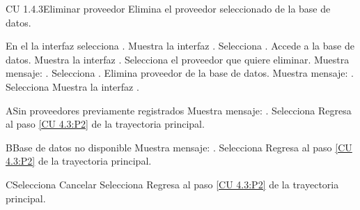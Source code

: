 \begin{UseCase} {CU 1.4.3}{Eliminar proveedor}{
	Elimina el proveedor seleccionado de la base de datos.
}





\end{UseCase}


\begin{UCtrayectoria}
	
	\UCpaso [\UCactor]	En el la interfaz  selecciona . 
	\UCpaso [\UCsist]		Muestra la interfaz . \label{CU 4.3:P2}
	\UCpaso [\UCactor]	Selecciona .
	\UCpaso [\UCsist]		Accede a la base de datos.  
	\UCpaso [\UCsist]		Muestra la interfaz .
	\UCpaso [\UCactor]	Selecciona el proveedor que quiere eliminar.
	\UCpaso [\UCactor]	Muestra mensaje: .
	\UCpaso [\UCactor]	Selecciona . 
	\UCpaso [\UCsist]		Elimina proveedor de la base de datos.
	\UCpaso [\UCsist]		Muestra mensaje: .
	\UCpaso [\UCactor]	Selecciona 
	\UCpaso [\UCsist]		Muestra la interfaz .

\end{UCtrayectoria}



\begin{UCtrayectoriaA}{A}{Sin proveedores previamente registrados}
	\UCpaso [\UCsist]		Muestra mensaje: .
	\UCpaso [\UCactor]	Selecciona 
	\UCpaso Regresa al paso \ref{CU 4.3:P2} de la trayectoria principal.
\end{UCtrayectoriaA}

\begin{UCtrayectoriaA}{B}{Base de datos no disponible}
	\UCpaso [\UCsist]		Muestra mensaje: .
	\UCpaso [\UCactor]	Selecciona 
	\UCpaso Regresa al paso \ref{CU 4.3:P2} de la trayectoria principal.
\end{UCtrayectoriaA}

\begin{UCtrayectoriaA}{C}{Selecciona Cancelar}
	\UCpaso [\UCactor]	Selecciona 
	\UCpaso Regresa al paso \ref{CU 4.3:P2} de la trayectoria principal.
\end{UCtrayectoriaA}